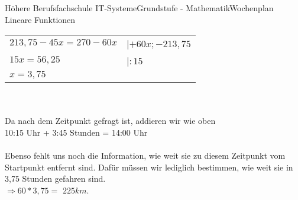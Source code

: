 \documentclass[oneside,openany,headings=optiontotoc,11pt,numbers=noenddot]{scrreprt}
\begin{document}
\begin{worksheet}{Höhere Berufsfachschule IT-Systeme}{Grundstufe - Mathematik}{Wochenplan Lineare Funktionen}
\begin{framed}
\begin{itemize}
				\begin{tabularx}{0.8\textwidth}{Xl}
					\(213,75 - 45x = 270 - 60x\) & |\(+60x; -213,75\)\\
					\(15x = 56,25\) & |\(:15\)\\
					\(x = 3,75\)
				\end{tabularx}\\
				\\
				Da nach dem Zeitpunkt gefragt ist, addieren wir wie oben\\
				10:15 Uhr + 3:45 Stunden = \colorbox{green!10}{14:00 Uhr}\\
				\\
				Ebenso fehlt uns noch die Information, wie weit sie zu diesem Zeitpunkt vom Startpunkt entfernt sind. Dafür müssen wir lediglich bestimmen, wie weit sie in 3,75 Stunden gefahren sind.\\
				\(\Rightarrow 60*3,75 =\) \colorbox{green!10}{\(225 km\)}.
			\end{itemize}
		\end{framed}
	\end{worksheet}
\end{document}
